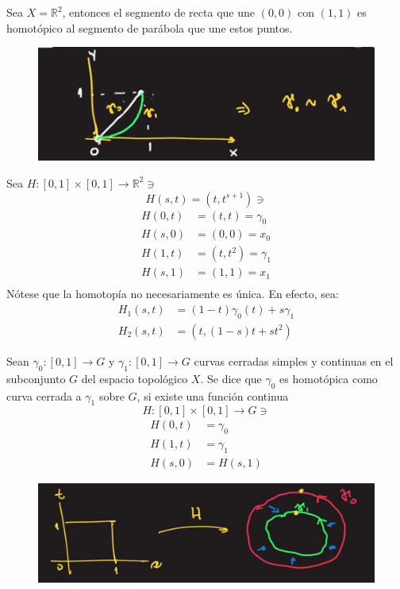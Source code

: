 \begin{ejemplo}
    Sea $X=\mathbb{R}^2$, entonces el segmento de recta que une $(0,0)$ con $(1,1)$ es homotópico al segmento de parábola que une estos puntos. 
    \begin{figure}[H]
        \centering
        \includegraphics[scale=.3]{imagenes/16.2.png}
    \end{figure}
    Sea $H:[0,1]\times [0,1]\to\mathbb{R}^2\ni$
    $$H(s,t)=(t,t^{s+1})\ni$$
    \begin{align*}
        H(0,t)&=(t,t)=\gamma_0\\
        H(s,0)&=(0,0)=x_0\\
        H(1,t)&=(t,t^2)=\gamma_1\\
        H(s,1)&=(1,1)=x_1\\
    \end{align*}
    Nótese que la homotopía no necesariamente es única. En efecto, sea: 
    \begin{align*}
        H_1(s,t) &= (1-t)\gamma_0(t)+s\gamma_1\\
        H_2(s,t) &= (t,(1-s)t+st^2)
    \end{align*}
\end{ejemplo}


\begin{dem}
    Sean $\gamma_0:[0,1]\to G$ y $\gamma_1:[0,1]\to G$ curvas cerradas simples y continuas en el subconjunto $G$ del espacio topológico $X$. Se dice que $\gamma_0$ es homotópica como curva cerrada a $\gamma_1$ sobre $G$, si existe una función continua 
    $$H:[0,1]\times [0,1]\to G\ni$$
    \begin{align*}
        H(0,t) &= \gamma_0\\
        H(1,t) &= \gamma_1\\
        H(s,0) &= H(s,1)
    \end{align*}
    \begin{figure}[H]
        \centering
        \includegraphics[scale=.3]{imagenes/16.3.png}
    \end{figure}
\end{dem}

